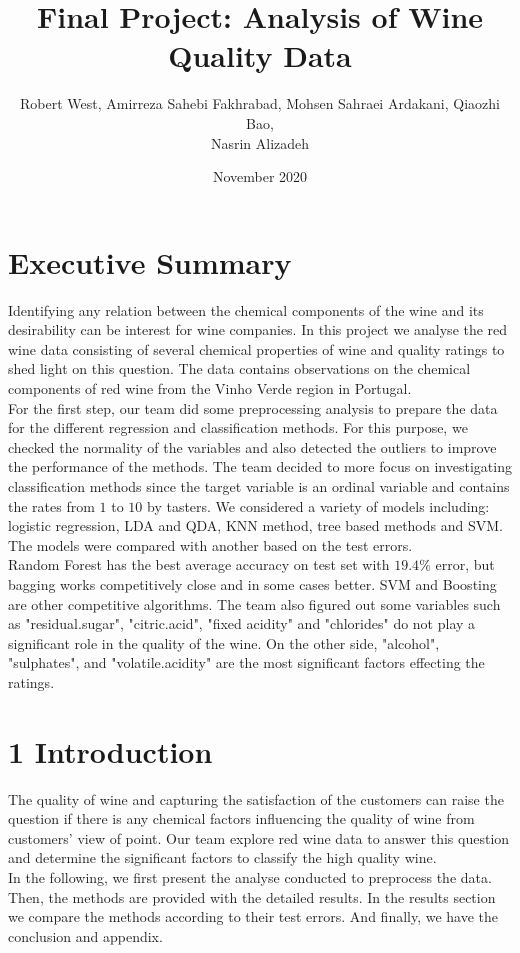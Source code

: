 \documentclass{article}
\title{Final Project: Analysis of Wine Quality Data}
\author{Robert West, Amirreza Sahebi Fakhrabad, Mohsen Sahraei Ardakani, Qiaozhi Bao,  \\Nasrin Alizadeh}
\date{November 2020}
\begin{document}
\maketitle

\section*{Executive Summary}
Identifying any relation between the chemical components of the wine and its desirability can be interest for wine companies. In this project we analyse the red wine data consisting of several chemical properties of wine and quality ratings to shed light on this question. The data contains observations on the chemical components of red wine from the Vinho Verde region in Portugal. \\
For the first step, our team did some preprocessing analysis to prepare the data for the different regression and classification methods. For this purpose, we checked the normality of the variables and also detected the outliers to improve the performance of the methods. The team decided to more focus on investigating classification methods since the target variable is an ordinal variable and contains the rates from $1$ to $10$ by tasters. We considered a variety of models including: logistic regression, LDA and QDA, KNN method, tree based methods and SVM. The models were compared with another based on the test errors.  \\Random Forest has the best average accuracy on test set with $19.4\%$ error, but bagging works competitively close and in some cases better. SVM and Boosting are other competitive algorithms. The team also figured out some variables such as "residual.sugar", "citric.acid", "fixed acidity" and "chlorides" do not play a significant role in the quality of the wine. On the other side, "alcohol", "sulphates", and "volatile.acidity" are the most significant factors effecting the ratings.

\section{1  Introduction}
The quality of wine and capturing the satisfaction of the customers can raise the question if there is any chemical factors influencing the quality of wine from customers' view of point. Our team explore red wine data to answer this question and determine the significant factors to classify the high quality wine. \\In the following, we first present the analyse conducted to preprocess the data. Then, the methods are provided with the detailed results. In the results section we compare the methods according to their test errors. And finally, we have the conclusion and appendix.
\end{document}
